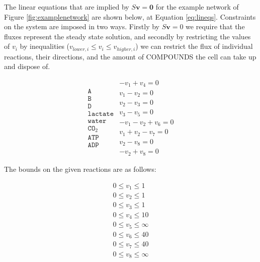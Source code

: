 \documentclass[10pt,a4paper]{article}
\begin{document}
	The linear equations that are implied by $S\mathbf{v}=\mathbf{0}$ for the example network of Figure \ref{fig:examplenetwork} are shown below, at Equation \ref{eq:lineqs}. Constraints on the system are imposed in two ways. Firstly by $S\mathbf{v}=0$ we require that the fluxes represent the steady state solution, and secondly by restricting the values of $v_i$ by inequalities ($v_{lower,i}\leq v_i \leq v_{higher,i}$) we can restrict the flux of individual reactions, their directions, and the amount of COMPOUNDS the cell can take up and dispose of. 
	

	\begin{equation}\label{eq:lineqs}
	\begin{matrix}
		\texttt{A}   \\
		\texttt{B}\\
		\texttt{D}\\
		\texttt{lactate}\\
		\texttt{water}\\
		\texttt{CO}_2\\
		\texttt{ATP}\\
		\texttt{ADP}
	\end{matrix}
		\begin{matrix}
			- v_1+v_4=0 \\
			v_1-v_2=0 \\
			v_2-v_3=0 \\
			v_3-v_5=0 \\
			-v_1-v_2+v_6=0 \\
			v_1+v_2-v_7=0 \\
			v_2-v_8=0 \\
			-v_2+v_8=0
		\end{matrix}
	\end{equation}

	The bounds on the given reactions are as follows: 

	\begin{equation}\label{eq:bounds}
		\begin{matrix}
			0\leq v_1 \leq 1\\
			0\leq v_2 \leq 1\\
			0\leq v_3 \leq 1\\
			0\leq v_4 \leq 10\\
			0\leq v_5 \leq \infty \\
			0\leq v_6 \leq 40\\
			0\leq v_7 \leq 40\\
			0\leq v_8 \leq \infty\\
		\end{matrix}
	\end{equation}
\end{document}
